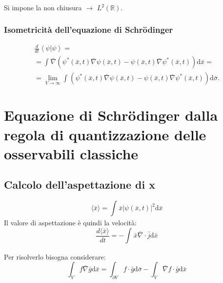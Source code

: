 Si impone la non chiusura $\rightarrow $ $L^2\left(\mathbb{R} \right)$.

\subsection{Isometricità dell'equazione di Schrödinger} %
\begin{equation}\begin{split}
\frac{d}{dt}\left \langle \psi |\psi  \right\rangle=\\
=\int_{}^{}{\bar \nabla \left(\psi ^*\left(\bar x,t\right)\bar \nabla \psi \left(\bar x,t\right)-\psi \left(\bar x,t\right)\bar \nabla \psi ^*\left(\bar x,t\right)\right) \textrm{d}\bar x}=\\
=\lim_{V\to \infty}{\int_{}^{}{\left(\psi ^*\left(\bar x,t\right)\bar \nabla \psi \left(\bar x,t\right)-\psi\left(\bar x,t\right) \bar \nabla \psi ^*\left(\bar x,t\right)\right) \textrm{d}\bar \sigma}}.
\end{split}\end{equation}

\chapter[Regola di quantizzazione delle osservabili]{Equazione di Schrödinger dalla regola di quantizzazione delle osservabili classiche} %
\section{Calcolo dell'aspettazione di x} %
\begin{equation}
\langle \bar x\rangle=\int_{}^{}{\bar x |\psi \left(\bar x,t\right)|^2 \textrm{d}\bar x}
\end{equation}
Il valore di aspettazione è quindi la velocità:
\begin{equation}
\frac{d\langle \bar x\rangle}{dt}=-\int_{}^{}{\bar x \bar \nabla \cdot \bar j \textrm{d}\bar x}
\end{equation}

Per risolverlo bisogna considerare:
\begin{equation}
\int_{V}^{}{f\bar \nabla \bar g \textrm{d}\bar x}=\int_{\partial V}^{}{f\cdot \bar g \textrm{d}\bar \sigma}-\int_{V}^{}{\bar \nabla f\cdot \bar g \textrm{d}\bar x}
\end{equation}


